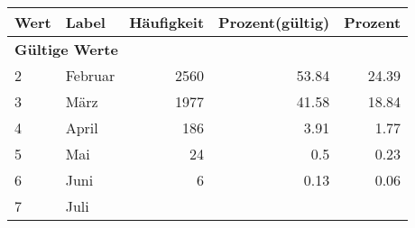      \begin{longtable}{lXrrr}
     \toprule
     \textbf{Wert} & \textbf{Label} & \textbf{Häufigkeit} & \textbf{Prozent(gültig)} & \textbf{Prozent} \\
     \endhead
     \midrule
     \multicolumn{5}{l}{\textbf{Gültige Werte}}\\

     2 &
     \multicolumn{1}{X}{ Februar   } &


       \num{2560} &
       \num[round-mode=places,round-precision=2]{53.84} &
         \num[round-mode=places,round-precision=2]{24.39} \\

     3 &
     \multicolumn{1}{X}{ März   } &


       \num{1977} &
       \num[round-mode=places,round-precision=2]{41.58} &
         \num[round-mode=places,round-precision=2]{18.84} \\

     4 &
     \multicolumn{1}{X}{ April   } &


       \num{186} &
       \num[round-mode=places,round-precision=2]{3.91} &
         \num[round-mode=places,round-precision=2]{1.77} \\

     5 &
     \multicolumn{1}{X}{ Mai   } &


       \num{24} &
       \num[round-mode=places,round-precision=2]{0.5} &
         \num[round-mode=places,round-precision=2]{0.23} \\

     6 &
     \multicolumn{1}{X}{ Juni   } &


       \num{6} &
       \num[round-mode=places,round-precision=2]{0.13} &
         \num[round-mode=places,round-precision=2]{0.06} \\

     7 &
     \multicolumn{1}{X}{ Juli   } &



\end{longtable}
